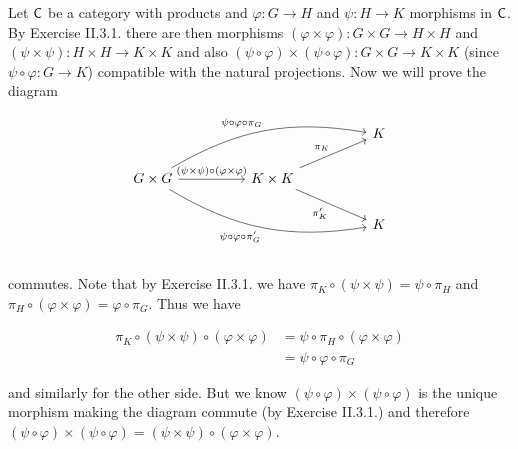 \begin{solution}
	Let $\mathsf{C}$ be a category with products and $\varphi: G \to H$ and $\psi: H \to K$ morphisms in $\mathsf{C}$. By Exercise II.3.1. there are then morphisms $(\varphi \times \varphi): G \times G \to H \times H$ and $(\psi \times \psi): H \times H \to K \times K$ and also $(\psi \circ \varphi) \times (\psi \circ \varphi): G \times G \to K \times K$ (since $\psi \circ \varphi: G \to K$) compatible with the natural projections. Now we will prove the diagram
	
	\begin{equation*}
		\begin{tikzcd}[column sep=huge]
			& & K \\
			G \times G
			\arrow[r, "(\psi \times \psi) \circ (\varphi \times \varphi)"]
			\arrow[urr, bend left=20, "\psi \circ \varphi \circ \pi_G"]
			\arrow[drr, bend right=20, "\psi \circ \varphi \circ \pi'_G"'] &
			K \times K
			\arrow[ur, "\pi_K"]
			\arrow[dr, "\pi'_K"'] & \\
			& & K \\
		\end{tikzcd}
	\end{equation*}
	
	commutes. Note that by Exercise II.3.1. we have $\pi_K \circ (\psi \times \psi) = \psi \circ \pi_H$ and $\pi_H \circ (\varphi \times \varphi) = \varphi \circ \pi_G$. Thus we have
	
	\begin{equation*}
		\begin{aligned}
			\pi_K \circ (\psi \times \psi) \circ (\varphi \times \varphi) &={} \psi \circ \pi_H \circ (\varphi \times \varphi)\\ &={} \psi \circ \varphi \circ \pi_G
		\end{aligned}
	\end{equation*}
	
	 and similarly for the other side. But we know $(\psi \circ \varphi) \times (\psi \circ \varphi)$ is the unique morphism making the diagram commute (by Exercise II.3.1.) and therefore $(\psi \circ \varphi) \times (\psi \circ \varphi) = (\psi \times \psi) \circ (\varphi \times \varphi)$.
\end{solution}

\begin{problem}
\end{problem}

